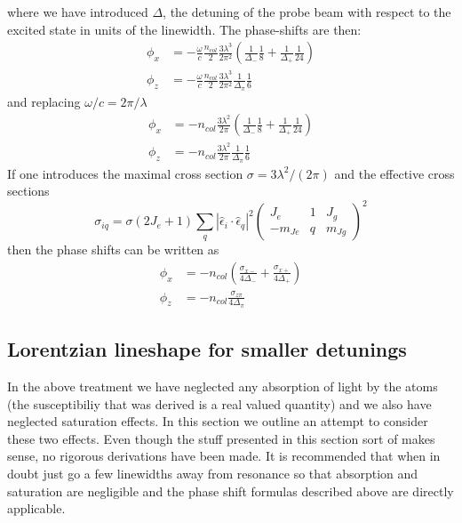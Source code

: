 \documentclass{article}[12pt]
\begin{document}
where we have introduced $\Delta$, the detuning of the probe beam with respect to the excited state in units of the linewidth.  The phase-shifts are then:
\begin{align}
\phi_{x} & = -\frac{\omega }{c}\frac{n_{col}}{2} \frac{ 3 \lambda^{3}}{2 \pi^{2}} \left(   \frac{1 }{\Delta_{-}}  \frac{1}{8} + \frac{1 }{\Delta_{+}} \frac{1}{24}  \right) \\
\phi_{z} & = - \frac{\omega }{c}\frac{n_{col}}{2} \frac{ 3  \lambda^{3}}{2 \pi^{2}}     \frac{1 }{\Delta_{\pi}}    \frac{1}{6} 
\end{align}
and replacing $\omega/c = 2\pi/\lambda$
\begin{align}
\phi_{x} & = -n_{col} \frac{ 3 \lambda^{2}}{2 \pi} \left(   \frac{1 }{\Delta_{-}}  \frac{1}{8} + \frac{1 }{\Delta_{+}} \frac{1}{24}  \right) \\
\phi_{z} & = -n_{col} \frac{ 3  \lambda^{2}}{2 \pi}     \frac{1 }{\Delta_{\pi}}    \frac{1}{6} 
\end{align}
If one introduces the maximal cross section $\sigma = 3\lambda^{2} /(2\pi)$ and the effective cross sections
\[
 \sigma_{iq} =   \sigma (2 J_{e} + 1) \sum_{q} |\hat{\epsilon}_{i}\cdot \hat{\epsilon}_{q}|^{2} \begin{pmatrix} J_{e} & 1 & J_{g} \\ -m_{Je} & q & m_{Jg} \end{pmatrix}^{2} \]
then the phase shifts can be written as 
\begin{align}
\phi_{x} & = -n_{col}  \left(   \frac{\sigma_{x-} }{4\Delta_{-}}  + \frac{\sigma_{x+} }{4\Delta_{+}} \right) \\
\phi_{z} & = -n_{col} \frac{\sigma_{z\pi} }{4\Delta_{\pi}}   
\end{align}

\subsection{ Lorentzian lineshape for smaller detunings}

In the above treatment we have neglected any absorption of light by the atoms (the susceptibiliy that was derived is a real valued  quantity) and we also have neglected saturation effects.  In this section we outline an attempt to consider these two effects.  Even though the stuff presented in this section sort of makes sense, no rigorous derivations have been made.  It is recommended that when in doubt just go a few linewidths away from resonance so that absorption and saturation are negligible and the phase shift formulas described above are directly applicable. 
\end{document}
